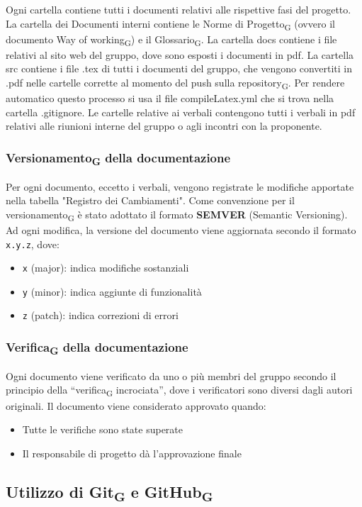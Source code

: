 \documentclass[11pt,a4paper]{article}
\newcommand{\gls}[1]{#1\textsubscript{G}}
\begin{document}
Ogni cartella contiene tutti i documenti relativi alle rispettive fasi del progetto.
La cartella dei Documenti interni contiene le \gls{Norme di Progetto} (ovvero il documento \gls{Way of working}) e il \gls{Glossario}.
La cartella docs contiene i file relativi al sito web del gruppo, dove sono esposti i documenti in pdf.
La cartella src contiene i file .tex di tutti i documenti del gruppo, che vengono convertiti in .pdf nelle cartelle corrette al momento del push sulla \gls{repository}. Per rendere automatico questo processo si usa il file compileLatex.yml che si trova nella cartella .gitignore.
Le cartelle relative ai verbali contengono tutti i verbali in pdf relativi alle riunioni interne del gruppo o agli incontri con la proponente.

\subsubsection{\gls{Versionamento} della documentazione}
Per ogni documento, eccetto i verbali, vengono registrate le modifiche apportate nella tabella "Registro dei Cambiamenti". 
Come convenzione per il \gls{versionamento} è stato adottato il formato \textbf{SEMVER} (Semantic Versioning). Ad ogni modifica, la versione del documento viene aggiornata secondo il formato \texttt{x.y.z}, dove:
\begin{itemize}
    \item \texttt{x} (major): indica modifiche sostanziali
    \item \texttt{y} (minor): indica aggiunte di funzionalità
    \item \texttt{z} (patch): indica correzioni di errori
\end{itemize}

\subsubsection{\gls{Verifica} della documentazione}
Ogni documento viene verificato da uno o più membri del gruppo secondo il principio della ``\gls{verifica} incrociata'', dove i verificatori sono diversi dagli autori originali.
Il documento viene considerato approvato quando:
\begin{itemize}
    \item Tutte le verifiche sono state superate
    \item Il responsabile di progetto dà l'approvazione finale
\end{itemize}

\subsection{Utilizzo di \gls{Git} e \gls{GitHub}}
\end{document}
